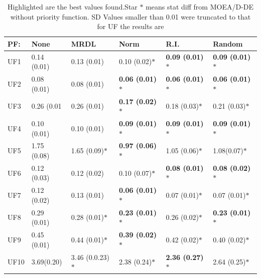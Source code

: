 \begin{table}[!t]
	\begin{tabular}{llllll}
		\cline{6-6}
		\hline
		\multicolumn{1}{|l|}{PF:}         & \multicolumn{1}{l|}{None} & \multicolumn{1}{l|}{MRDL} & \multicolumn{1}{l|}{Norm} & \multicolumn{1}{l|}{R.I.} & \multicolumn{1}{l|}{Random} \\ \hline \hline
		\multicolumn{1}{|l|}{UF1}              & \multicolumn{1}{l}{0.14 (0.01)} & \multicolumn{1}{l}{0.13 (0.01)} & \multicolumn{1}{l}{0.10 (0.02)$*$} & \textbf{0.09 (0.01)$*$}             & \textbf{0.09 (0.01)$*$} \\ \hline
		\multicolumn{1}{|l|}{UF2}              & \multicolumn{1}{l}{0.08 (0.01)} & \multicolumn{1}{l}{0.08 (0.01)} & \multicolumn{1}{l}{ \textbf{0.06 (0.01)$*$}} & \textbf{0.06 (0.01)$*$}             & \textbf{0.06 (0.01)$*$} \\ \hline
		\multicolumn{1}{|l|}{UF3}              & \multicolumn{1}{l}{0.26 (0.01} & \multicolumn{1}{l}{0.26 (0.01)} & \multicolumn{1}{l}{ \textbf{0.17 (0.02)}$*$} & 0.18 (0.03)$*$             &  0.21 (0.03)$*$ \\ \hline
		\multicolumn{1}{|l|}{UF4}              & \multicolumn{1}{l}{0.10 (0.01)} & \multicolumn{1}{l}{ 0.10 (0.01)} & \multicolumn{1}{l}{ \textbf{0.09 (0.01)}$*$} & \textbf{0.09 (0.01)$*$}             & \textbf{0.09 (0.01)$*$} \\ \hline
		\multicolumn{1}{|l|}{UF5}              & \multicolumn{1}{l}{1.75 (0.08)} & \multicolumn{1}{l}{1.65 (0.09)$*$} & \multicolumn{1}{l}{ \textbf{0.97 (0.06)$*$}} & 1.05 (0.06)$*$            & 1.08(0.07)$*$ \\ \hline
		\multicolumn{1}{|l|}{UF6}              & \multicolumn{1}{l}{0.12 (0.03)} & \multicolumn{1}{l}{0.12 (0.02)} & \multicolumn{1}{l}{ 0.10 (0.07)$*$} & \textbf{0.08 (0.01)$*$}            & \textbf{0.08 (0.02)$*$} \\ \hline		
		\multicolumn{1}{|l|}{UF7}              & \multicolumn{1}{l}{0.12 (0.02)} & \multicolumn{1}{l}{0.13 (0.01)} & \multicolumn{1}{l}{ \textbf{0.06 (0.01)$*$}} & 0.07 (0.01)$*$             & 0.07 (0.01)$*$ \\ \hline
		\multicolumn{1}{|l|}{UF8}              & \multicolumn{1}{l}{0.29 (0.01)} & \multicolumn{1}{l}{0.28 (0.01)$*$} & \multicolumn{1}{l}{ \textbf{0.23 (0.01)$*$}} & 0.26 (0.02)$*$             & \textbf{0.23 (0.01)$*$} \\ \hline
		\multicolumn{1}{|l|}{UF9}              & \multicolumn{1}{l}{0.45 (0.01)} & \multicolumn{1}{l}{0.44 (0.01)$*$} & \multicolumn{1}{l}{ \textbf{0.39 (0.02)$*$}} & 0.42 (0.02)$*$             & 0.40 (0.02)$*$ \\ \hline
		\multicolumn{1}{|l|}{UF10}              & \multicolumn{1}{l}{3.69(0.20)} & \multicolumn{1}{l}{3.46 (0.0.23)$*$} & \multicolumn{1}{l}{ 2.38 (0.24)$*$} & \textbf{2.36 (0.27)$*$}             & 2.64 (0.25)$*$ \\ \hline
	\end{tabular}
	\caption{Highlighted are the best values found.Star $*$ means stat diff from MOEA/D-DE without priority function. SD Values smaller than 0.01 were truncated to that\\ for UF the results are}
		\label{table_igd}
\end{table}


